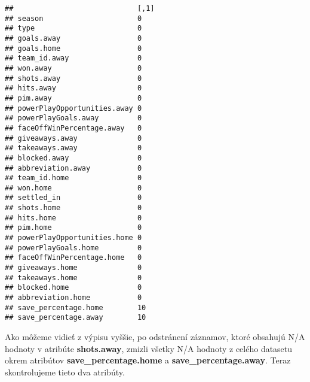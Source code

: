 \documentclass[
]{article}
\newenvironment{Shaded}{\begin{snugshade}}{\end{snugshade}}
\newcommand{\FunctionTok}[1]{\textcolor[rgb]{0.00,0.00,0.00}{#1}}
\newcommand{\NormalTok}[1]{#1}
\newcommand{\SpecialCharTok}[1]{\textcolor[rgb]{0.00,0.00,0.00}{#1}}
\begin{document}
\begin{verbatim}
##                             [,1]
## season                      0   
## type                        0   
## goals.away                  0   
## goals.home                  0   
## team_id.away                0   
## won.away                    0   
## shots.away                  0   
## hits.away                   0   
## pim.away                    0   
## powerPlayOpportunities.away 0   
## powerPlayGoals.away         0   
## faceOffWinPercentage.away   0   
## giveaways.away              0   
## takeaways.away              0   
## blocked.away                0   
## abbreviation.away           0   
## team_id.home                0   
## won.home                    0   
## settled_in                  0   
## shots.home                  0   
## hits.home                   0   
## pim.home                    0   
## powerPlayOpportunities.home 0   
## powerPlayGoals.home         0   
## faceOffWinPercentage.home   0   
## giveaways.home              0   
## takeaways.home              0   
## blocked.home                0   
## abbreviation.home           0   
## save_percentage.home        10  
## save_percentage.away        10
\end{verbatim}

Ako môžeme vidieť z výpisu vyššie, po odstránení záznamov, ktoré
obsahujú N/A hodnoty v atribúte \textbf{shots.away}, zmizli všetky N/A
hodnoty z celého datasetu okrem atribútov \textbf{save\_percentage.home}
a \textbf{save\_percentage.away}. Teraz skontrolujeme tieto dva
atribúty.

\begin{Shaded}
\end{Shaded}
\end{document}
